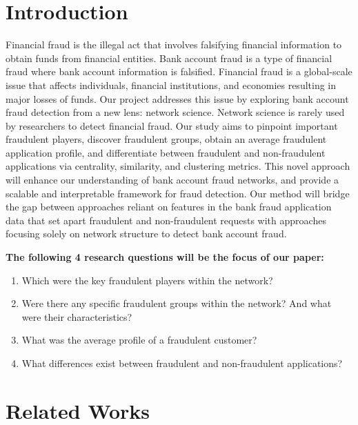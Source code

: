\documentclass{styles/svproc}
\begin{document}
\section{Introduction}
Financial fraud is the illegal act that involves falsifying financial information to obtain funds from financial entities. Bank account fraud is a type of financial fraud where bank account information is falsified. Financial fraud is a global-scale issue that affects individuals, financial institutions, and economies resulting in major losses of funds. Our project addresses this issue by exploring bank account fraud detection from a new lens: network science. Network science is rarely used by researchers to detect financial fraud. Our study aims to pinpoint important fraudulent players, discover fraudulent groups, obtain an average fraudulent application profile, and differentiate between fraudulent and non-fraudulent applications via centrality, similarity, and clustering metrics. This novel approach will enhance our understanding of bank account fraud networks, and provide a scalable and interpretable framework for fraud detection. Our method will bridge the gap between approaches reliant on features in the bank fraud application data that set apart fraudulent and non-fraudulent requests with approaches focusing solely on network structure to detect bank account fraud.

\bigskip
\noindent\textbf{The following 4 research questions will be the focus of our paper:}

\begin{enumerate}
  \item Which were the key fraudulent players within the network?
  \item Were there any specific fraudulent groups within the network? And what were their characteristics?
  \item What was the average profile of a fraudulent customer?
  \item What differences exist between fraudulent and non-fraudulent applications?
\end{enumerate}

\section{Related Works}
\end{document}
